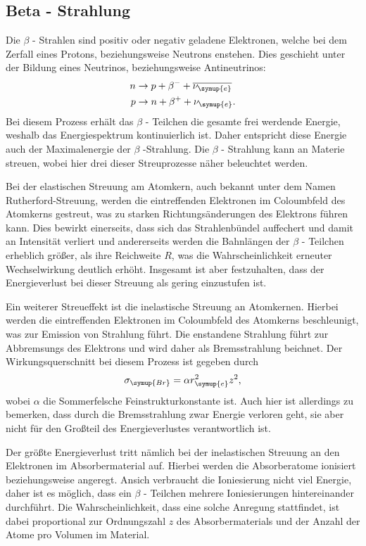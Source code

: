 \subsection{Beta - Strahlung}
Die $\beta$ - Strahlen sind positiv oder negativ geladene Elektronen, welche bei dem Zerfall eines Protons, beziehungsweise Neutrons enstehen.
Dies geschieht unter der Bildung eines Neutrinos, beziehungsweise Antineutrinos:
\begin{align}
    \label{eqn:kernreaktionen}
    n &\to p + \beta^{-} + \overline{\nu_{\symup{e}}} \\
    p &\to n + \beta^{+} + \nu_{\symup{e}}. 
\end{align}     
Bei diesem Prozess erhält das $\beta$ - Teilchen die gesamte frei werdende Energie, weshalb das Energiespektrum kontinuierlich ist.
Daher entspricht diese Energie auch der Maximalenergie der $\beta$ -Strahlung.
Die $\beta$ - Strahlung kann an Materie streuen, wobei hier drei dieser Streuprozesse näher beleuchtet werden.


Bei der elastischen Streuung am Atomkern, auch bekannt unter dem Namen Rutherford-Streuung, werden die eintreffenden Elektronen 
im Coloumbfeld des Atomkerns gestreut, was zu starken Richtungsänderungen des Elektrons führen kann. Dies bewirkt einerseits, dass sich das
Strahlenbündel auffechert und damit an Intensität verliert und andererseits werden die Bahnlängen der $\beta$ - Teilchen erheblich größer,
als ihre Reichweite $R$, was die Wahrscheinlichkeit erneuter Wechselwirkung deutlich erhöht. Insgesamt ist aber festzuhalten, dass
der Energieverlust bei dieser Streuung als gering einzustufen ist.

Ein weiterer Streueffekt ist die inelastische Streuung an Atomkernen. Hierbei werden die eintreffenden Elektronen im Coloumbfeld des Atomkerns
beschleunigt, was zur Emission von Strahlung führt. Die enstandene Strahlung führt zur Abbremsungs des Elektrons und wird daher als 
Bremsstrahlung beichnet. Der Wirkungsquerschnitt bei diesem Prozess ist gegeben durch
\begin{equation}
    \label{eqn:wirkung_inelastisch}
    \sigma_{\symup{Br}} = \alpha r_{\symup{e}}^2 z^2,
\end{equation}
wobei $\alpha$ die Sommerfelsche Feinstrukturkonstante ist. Auch hier ist allerdings zu bemerken, dass durch die Bremsstrahlung zwar Energie 
verloren geht, sie aber nicht für den Großteil des Energieverlustes verantwortlich ist. 

Der größte Energieverlust tritt nämlich bei der inelastischen Streuung an den Elektronen im Absorbermaterial auf. Hierbei werden die Absorberatome 
ionisiert beziehungsweise angeregt. Ansich verbraucht die Ioniesierung nicht viel Energie, daher ist es möglich, dass ein $\beta$ - Teilchen mehrere
Ioniesierungen hintereinander durchführt. Die Wahrscheinlichkeit, dass eine solche Anregung stattfindet, ist dabei proportional zur Ordnungszahl
$z$ des Absorbermaterials und der Anzahl der Atome pro Volumen im Material.

